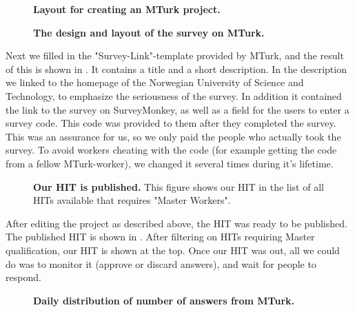 \begin{figure}[t]
\centering
{}
\caption[Layout for creating an MTurk project]{\textbf{Layout for creating an MTurk project.}} 
\label{fig:amtedit}
\end{figure}

\begin{figure}[t]
\centering
{}
\caption[The design and layout of the survey on MTurk]{\textbf{The design and layout of the survey on MTurk.}} 
\label{fig:amtlayout}
\end{figure}

Next we filled in the "Survey-Link"-template provided by MTurk, and the result of this is shown in . It contains a title and a short description. In the description we linked to the homepage of the Norwegian University of Science and Technology, to emphasize the seriousness of the survey. In addition it contained the link to the survey on SurveyMonkey, as well as a field for the users to enter a survey code. This code was provided to them after they completed the survey. This was an assurance for us, so we only paid the people who actually took the survey. To avoid workers cheating with the code (for example getting the code from a fellow MTurk-worker), we changed it several times during it's lifetime. 

\begin{figure}[t]
\centering
{}
\caption[Our HIT is published]{\textbf{Our HIT is published.} This figure shows our HIT in the list of all HITs available that requires "Master Workers".} 
\label{fig:hitout}
\end{figure}

After editing the project as described above, the HIT was ready to be published. The published HIT is shown in . After filtering on HITs requiring Master qualification, our HIT is shown at the top. 
Once our HIT was out, all we could do was to monitor it (approve or discard answers), and wait for people to respond. 

\begin{figure}[t]
\centering
{}
\caption[Daily distribution of number of answers from MTurk]{\textbf{Daily distribution of number of answers from MTurk.}} 
\label{fig:answersamt}
\end{figure}

